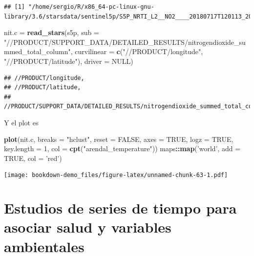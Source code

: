 \documentclass[]{book}
\newenvironment{Shaded}{\begin{snugshade}}{\end{snugshade}}
\newcommand{\DataTypeTok}[1]{\textcolor[rgb]{0.13,0.29,0.53}{#1}}
\newcommand{\DecValTok}[1]{\textcolor[rgb]{0.00,0.00,0.81}{#1}}
\newcommand{\KeywordTok}[1]{\textcolor[rgb]{0.13,0.29,0.53}{\textbf{#1}}}
\newcommand{\NormalTok}[1]{#1}
\newcommand{\OperatorTok}[1]{\textcolor[rgb]{0.81,0.36,0.00}{\textbf{#1}}}
\newcommand{\OtherTok}[1]{\textcolor[rgb]{0.56,0.35,0.01}{#1}}
\newcommand{\StringTok}[1]{\textcolor[rgb]{0.31,0.60,0.02}{#1}}
\begin{document}
\begin{verbatim}
## [1] "/home/sergio/R/x86_64-pc-linux-gnu-library/3.6/starsdata/sentinel5p/S5P_NRTI_L2__NO2____20180717T120113_20180717T120613_03932_01_010002_20180717T125231.nc"
\end{verbatim}

\begin{Shaded}
\begin{Highlighting}[]
\NormalTok{nit.c =}\StringTok{ }\KeywordTok{read_stars}\NormalTok{(s5p, }\DataTypeTok{sub =} \StringTok{"//PRODUCT/SUPPORT_DATA/DETAILED_RESULTS/nitrogendioxide_summed_total_column"}\NormalTok{,}
                   \DataTypeTok{curvilinear =} \KeywordTok{c}\NormalTok{(}\StringTok{"//PRODUCT/longitude"}\NormalTok{, }
                                   \StringTok{"//PRODUCT/latitude"}\NormalTok{), }
                   \DataTypeTok{driver =} \OtherTok{NULL}\NormalTok{)}
\end{Highlighting}
\end{Shaded}

\begin{verbatim}
## //PRODUCT/longitude, 
## //PRODUCT/latitude, 
## //PRODUCT/SUPPORT_DATA/DETAILED_RESULTS/nitrogendioxide_summed_total_column,
\end{verbatim}

Y el plot es

\begin{Shaded}
\begin{Highlighting}[]
\KeywordTok{plot}\NormalTok{(nit.c, }
     \DataTypeTok{breaks =} \StringTok{"hclust"}\NormalTok{, }
     \DataTypeTok{reset =} \OtherTok{FALSE}\NormalTok{, }
     \DataTypeTok{axes =} \OtherTok{TRUE}\NormalTok{,}
     \DataTypeTok{logz =} \OtherTok{TRUE}\NormalTok{, }
     \DataTypeTok{key.length =} \DecValTok{1}\NormalTok{,}
     \DataTypeTok{col =} \KeywordTok{cpt}\NormalTok{(}\StringTok{"arendal_temperature"}\NormalTok{))}
\NormalTok{maps}\OperatorTok{::}\KeywordTok{map}\NormalTok{(}\StringTok{'world'}\NormalTok{, }\DataTypeTok{add =} \OtherTok{TRUE}\NormalTok{, }\DataTypeTok{col =} \StringTok{'red'}\NormalTok{)}
\end{Highlighting}
\end{Shaded}

\texttt{[image: bookdown-demo\_files/figure-latex/unnamed-chunk-63-1.pdf]}

\hypertarget{estudios-de-series-de-tiempo-para-asociar-salud-y-variables-ambientales}{%
\chapter{Estudios de series de tiempo para asociar salud y variables ambientales}\label{estudios-de-series-de-tiempo-para-asociar-salud-y-variables-ambientales}}
\end{document}
